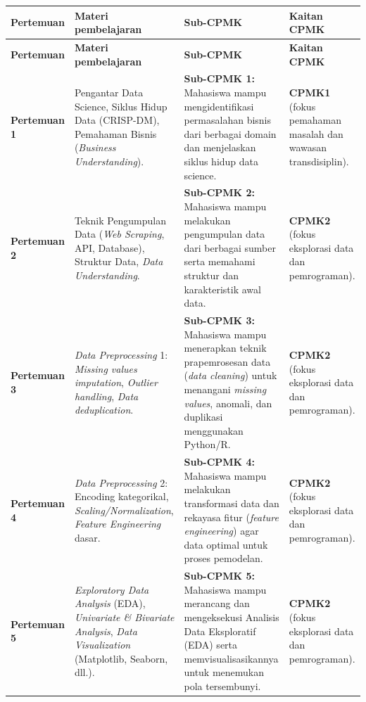 \documentclass[12pt,a4paper]{article}
\begin{document}
\vspace{0.35cm}
{\small\setlength{\tabcolsep}{3.5pt}%
\begin{longtable}{|>{\raggedright\arraybackslash}p{2.05cm}|>{\raggedright\arraybackslash}p{4.55cm}|>{\raggedright\arraybackslash}p{4.55cm}|>{\raggedright\arraybackslash}p{2.95cm}|}
\hline
\textbf{Pertemuan} & \textbf{Materi pembelajaran} & \textbf{Sub-CPMK} & \textbf{Kaitan CPMK} \\
\hline
\endfirsthead
\hline
\textbf{Pertemuan} & \textbf{Materi pembelajaran} & \textbf{Sub-CPMK} & \textbf{Kaitan CPMK} \\
\hline
\endhead
\hline
\endfoot

\textbf{Pertemuan 1} &
Pengantar Data Science, Siklus Hidup Data (CRISP-DM), Pemahaman Bisnis (\textit{Business Understanding}). &
\textbf{Sub-CPMK 1:} Mahasiswa mampu mengidentifikasi permasalahan bisnis dari berbagai domain dan menjelaskan siklus hidup data science. &
\textbf{CPMK1} (fokus pemahaman masalah dan wawasan transdisiplin). \\
\hline

\textbf{Pertemuan 2} &
Teknik Pengumpulan Data (\textit{Web Scraping}, API, Database), Struktur Data, \textit{Data Understanding}. &
\textbf{Sub-CPMK 2:} Mahasiswa mampu melakukan pengumpulan data dari berbagai sumber serta memahami struktur dan karakteristik awal data. &
\textbf{CPMK2} (fokus eksplorasi data dan pemrograman). \\
\hline

\textbf{Pertemuan 3} &
\textit{Data Preprocessing} 1: \textit{Missing values imputation}, \textit{Outlier handling}, \textit{Data deduplication}. &
\textbf{Sub-CPMK 3:} Mahasiswa mampu menerapkan teknik prapemrosesan data (\textit{data cleaning}) untuk menangani \textit{missing values}, anomali, dan duplikasi menggunakan Python/R. &
\textbf{CPMK2} (fokus eksplorasi data dan pemrograman). \\
\hline

\textbf{Pertemuan 4} &
\textit{Data Preprocessing} 2: Encoding kategorikal, \textit{Scaling/Normalization}, \textit{Feature Engineering} dasar. &
\textbf{Sub-CPMK 4:} Mahasiswa mampu melakukan transformasi data dan rekayasa fitur (\textit{feature engineering}) agar data optimal untuk proses pemodelan. &
\textbf{CPMK2} (fokus eksplorasi data dan pemrograman). \\
\hline

\textbf{Pertemuan 5} &
\textit{Exploratory Data Analysis} (EDA), \textit{Univariate \& Bivariate Analysis}, \textit{Data Visualization} (Matplotlib, Seaborn, dll.). &
\textbf{Sub-CPMK 5:} Mahasiswa mampu merancang dan mengeksekusi Analisis Data Eksploratif (EDA) serta memvisualisasikannya untuk menemukan pola tersembunyi. &
\textbf{CPMK2} (fokus eksplorasi data dan pemrograman). \\
\hline


\end{longtable}}
\end{document}
